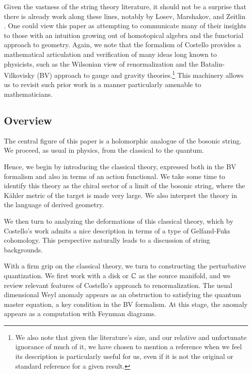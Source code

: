 Given the vastness of the string theory literature,
it should not be a surprise that there is already work along these lines,
notably by Losev, Marshakov, and Zeitlin \cite{LMZ}.
One could view this paper as attempting to communicate many of their insights to those with an intuition growing out of homotopical algebra and the functorial approach to geometry.
Again, we note that the formalism of Costello provides a mathematical articulation and verification of many ideas long known to physicists, such as the Wilsonian view of renormalization and the Batalin-Vilkovisky (BV) approach to gauge and gravity theories.\footnote{We also note that given the literature's size,
and our relative and unfortunate ignorance of much of it,
we have chosen to mention a reference when we feel its description is particularly useful for us, 
even if it is not the original or standard reference for a given result.}
This machinery allows us to revisit such prior work in a manner particularly amenable to mathematicians.

\subsection{Overview} \label{sec:bvoverview}

The central figure of this paper is a holomorphic analogue of the bosonic string.
We proceed, as usual in physics, from the classical to the quantum.

Hence, we begin by introducing the classical theory, 
expressed both in the BV formalism and also in terms of an action functional.
We take some time to identify this theory as the chiral sector of a limit of the bosonic string,
where the K\"{a}hler metric of the target is made very large. 
We also interpret the theory in the language of derived geometry.

We then turn to analyzing the deformations of this classical theory,
which by Costello's work admits a nice description in terms of a type of Gelfand-Fuks cohomology.
This perspective naturally leads to a discussion of string backgrounds.

With a firm grip on the classical theory, we turn to constructing the perturbative quantization.
We first work with a disk or $\mathbb C$ as the source manifold,
and we review relevant features of Costello's approach to renormalization.
The usual dimensional Weyl anomaly appears as an obstruction to satisfying the quantum master equation,
a key condition in the BV formalism.
At this stage, the anomaly appears as a computation with Feynman diagrams.

